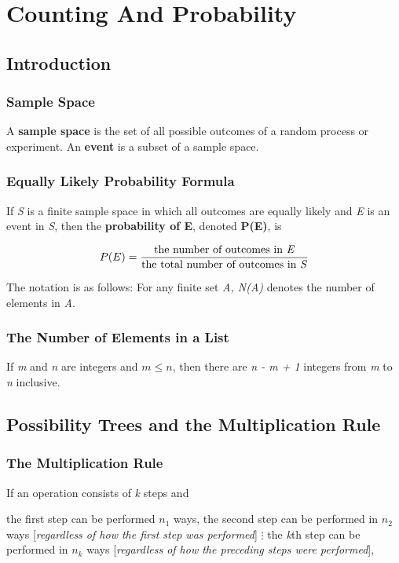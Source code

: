 \documentclass{article}
\begin{document}
\setcounter{section}{8}
\section{Counting And Probability}
\subsection{Introduction}

\subsubsection{Sample Space}
A \textbf{sample space} is the set of all possible outcomes of a random process or experiment. An \textbf{event} is a subset of a sample space.

\subsubsection{Equally Likely Probability Formula}
If \textit{S} is a finite sample space in which all outcomes are equally likely and \textit{E} is an event in \textit{S}, then the \textbf{probability of E}, denoted \textbf{P(E)}, is

\begin{equation}
P(E) = \frac{\text{the number of outcomes in \textit{E}}}{\text{the total number of outcomes in \textit{S}}}
\end{equation}

The notation is as follows: For any finite set \textit{A, N(A)} denotes the number of elements in \textit{A}.

\subsubsection{The Number of Elements in a List}
If \textit{m} and \textit{n} are integers and $m \leq n$, then there are \textit{n - m + 1} integers from \textit{m} to \textit{n} inclusive.

\subsection{Possibility Trees and the Multiplication Rule}
\subsubsection{The Multiplication Rule}
If an operation consists of \textit{k} steps and

\begin{center}
the first step can be performed $n_1$ ways,
the second step can be performed in $n_2$ ways [\textit{regardless of how the first step was performed}]
$\vdots$
the \textit{k}th step can be performed in $n_k$ ways [\textit{regardless of how the preceding steps were performed}],
\end{center}
\end{document}
